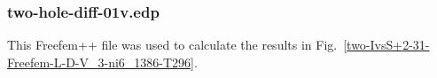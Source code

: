 

   \subsubsection{two-hole-diff-01v.edp}
This Freefem++ file was used to calculate the results in
Fig.~\ref{two-IvsS+2-31-Freefem-L-D-V_3-ni6_1386-T296}.


%

%

